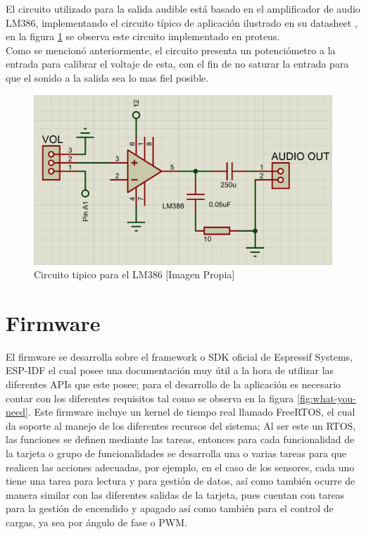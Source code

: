 		El circuito utilizado para la salida audible está basado en el amplificador de audio LM386, implementando el circuito típico de aplicación ilustrado en su datasheet  \cite{LM386}, en la figura \ref{fig:AUD} se observa este circuito implementado en proteus.\\
		
		Como se mencionó anteriormente, el circuito presenta un potenciómetro a la entrada para calibrar el voltaje de esta, con el fin de no saturar la entrada para que el sonido a la salida sea lo mas fiel posible.
				
		\begin{figure}[H]
			\centering
			\caption{Circuito tipico para el LM386 [Imagen Propia]}
			\label{fig:AUD}
			\includegraphics[width=0.7\linewidth]{Imagenes/AUD}
		\end{figure}		
				
\section{Firmware}

El firmware se desarrolla sobre el framework o SDK oficial de Espressif Systems, ESP-IDF el cual posee una documentación \cite{ES} muy útil a la hora de utilizar las diferentes APIs que este posee; para el desarrollo de la aplicación es necesario contar con los diferentes requisitos tal como se observa en la figura \ref{fig:what-you-need}. Este firmware incluye un kernel de tiempo real llamado FreeRTOS, el cual da soporte al manejo de los diferentes recursos del sistema; Al ser este  un RTOS, las funciones se definen mediante las tareas, entonces para cada funcionalidad de la tarjeta o grupo de funcionalidades se desarrolla una o varias tareas para que realicen las acciones adecuadas, por ejemplo, en el caso de los sensores, cada uno tiene una tarea para lectura y para gestión de datos, así como también ocurre de manera similar  con las diferentes salidas de la tarjeta, pues cuentan con tareas para la gestión de encendido y apagado así como también para el control de cargas, ya sea por ángulo de fase o PWM.\\

